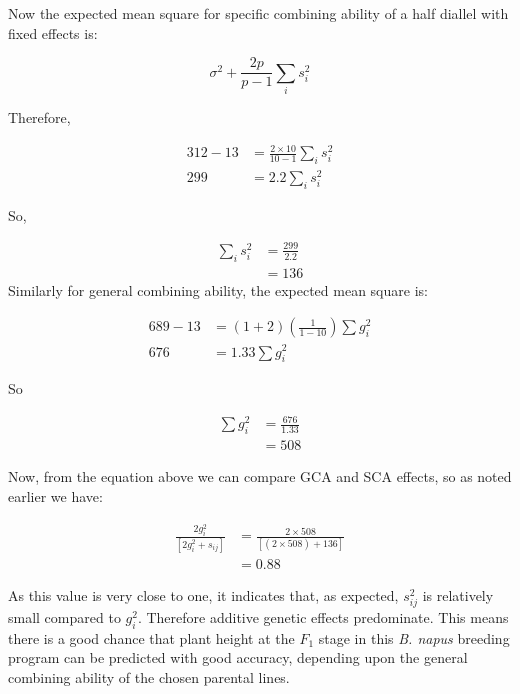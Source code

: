 \documentclass[nofonts,]{tufte-handout}
\begin{document}
Now the expected mean square for specific combining ability of a half
diallel with fixed effects is:

\[
\sigma^2 + \frac{2p}{p-1}\sum_is_i^2
\]

Therefore,

\[
\begin{aligned}
312-13 &= \frac{2\times 10}{10-1}\sum_is_i^2 \\
299 &= 2.2\sum_is_i^2
\end{aligned}
\]

So,

\[
\begin{aligned}
\sum_is_i^2 &= \frac{299}{2.2} \\
& = 136
\end{aligned}
\] Similarly for general combining ability, the expected mean square is:

\[
\begin{aligned}
689-13 &= (1 + 2)\left(\frac{1}{1-10}\right)\sum g_i^2 \\
676 &= 1.33 \sum g_i^2 
\end{aligned}
\]

So

\[
\begin{aligned}
\sum g_i^2 &= \frac{676}{1.33} \\
&= 508
\end{aligned}
\]

Now, from the equation above we can compare GCA and SCA effects, so as
noted earlier we have:

\[
\begin{aligned}
\frac{2g_i^2}{[2g_i^2 + s_{ij}]} &= \frac{2\times 508}{[(2\times 508) + 136]} \\
&= 0.88
\end{aligned}
\]

As this value is very close to one, it indicates that, as expected,
\(s_{ij}^2\) is relatively small compared to \(g_i^2\). Therefore
additive genetic effects predominate. This means there is a good chance
that plant height at the \(F_1\) stage in this \emph{B. napus} breeding
program can be predicted with good accuracy, depending upon the general
combining ability of the chosen parental lines.


\end{document}

